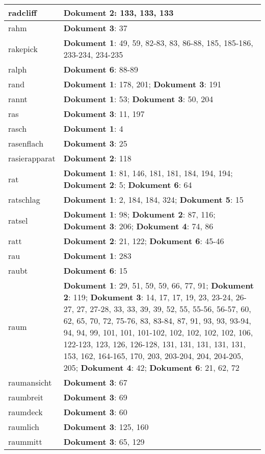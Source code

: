 \documentclass[a5paper]{article}
\begin{document}
\begin{longtable}[l]{|l|p{3in}|}
\hline
radcliff & \textbf{Dokument 2}: 133, 133, 133 \\
\hline
rahm & \textbf{Dokument 3}: 37 \\
\hline
rakepick & \textbf{Dokument 1}: 49, 59, 82-83, 83, 86-88, 185, 185-186, 233-234, 234-235 \\
\hline
ralph & \textbf{Dokument 6}: 88-89 \\
\hline
rand & \textbf{Dokument 1}: 178, 201; \textbf{Dokument 3}: 191 \\
\hline
rannt & \textbf{Dokument 1}: 53; \textbf{Dokument 3}: 50, 204 \\
\hline
ras & \textbf{Dokument 3}: 11, 197 \\
\hline
rasch & \textbf{Dokument 1}: 4 \\
\hline
rasenflach & \textbf{Dokument 3}: 25 \\
\hline
rasierapparat & \textbf{Dokument 2}: 118 \\
\hline
rat & \textbf{Dokument 1}: 81, 146, 181, 181, 184, 194, 194; \textbf{Dokument 2}: 5; \textbf{Dokument 6}: 64 \\
\hline
ratschlag & \textbf{Dokument 1}: 2, 184, 184, 324; \textbf{Dokument 5}: 15 \\
\hline
ratsel & \textbf{Dokument 1}: 98; \textbf{Dokument 2}: 87, 116; \textbf{Dokument 3}: 206; \textbf{Dokument 4}: 74, 86 \\
\hline
ratt & \textbf{Dokument 2}: 21, 122; \textbf{Dokument 6}: 45-46 \\
\hline
rau & \textbf{Dokument 1}: 283 \\
\hline
raubt & \textbf{Dokument 6}: 15 \\
\hline
raum & \textbf{Dokument 1}: 29, 51, 59, 59, 66, 77, 91; \textbf{Dokument 2}: 119; \textbf{Dokument 3}: 14, 17, 17, 19, 23, 23-24, 26-27, 27, 27-28, 33, 33, 39, 39, 52, 55, 55-56, 56-57, 60, 62, 65, 70, 72, 75-76, 83, 83-84, 87, 91, 93, 93, 93-94, 94, 94, 99, 101, 101, 101-102, 102, 102, 102, 102, 106, 122-123, 123, 126, 126-128, 131, 131, 131, 131, 131, 153, 162, 164-165, 170, 203, 203-204, 204, 204-205, 205; \textbf{Dokument 4}: 42; \textbf{Dokument 6}: 21, 62, 72 \\
\hline
raumansicht & \textbf{Dokument 3}: 67 \\
\hline
raumbreit & \textbf{Dokument 3}: 69 \\
\hline
raumdeck & \textbf{Dokument 3}: 60 \\
\hline
raumlich & \textbf{Dokument 3}: 125, 160 \\
\hline
raummitt & \textbf{Dokument 3}: 65, 129 \\

\end{longtable}
\end{document}

